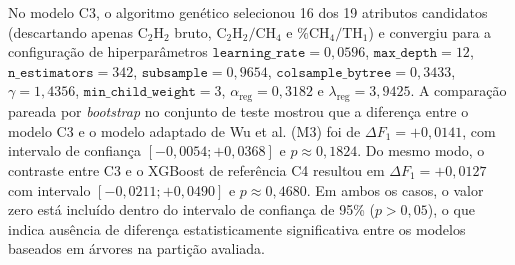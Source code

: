 \begin{table}[H]
\centering
\caption{Desempenho diagnóstico multiclasse no Track B sobre o conjunto de teste e validação cruzada.}
\label{tab:track_b_desempenho}
\end{table}

No modelo C3, o algoritmo genético selecionou 16 dos 19 atributos candidatos (descartando apenas $\text{C}_2\text{H}_2$ bruto, $\text{C}_2\text{H}_2/\text{CH}_4$ e $\% \text{CH}_4/\text{TH}_1$) e convergiu para a configuração de hiperparâmetros $\texttt{learning\_rate} = 0,0596$, $\texttt{max\_depth} = 12$, $\texttt{n\_estimators} = 342$, $\texttt{subsample} = 0,9654$, $\texttt{colsample\_bytree} = 0,3433$, $\gamma = 1,4356$, $\texttt{min\_child\_weight} = 3$, $\alpha_{\text{reg}} = 0,3182$ e $\lambda_{\text{reg}} = 3,9425$. A comparação pareada por \textit{bootstrap} no conjunto de teste mostrou que a diferença entre o modelo C3 e o modelo adaptado de Wu et al. (M3) foi de $\Delta F_1 = +0,0141$, com intervalo de confiança $[-0,0054; +0,0368]$ e $p \approx 0,1824$. Do mesmo modo, o contraste entre C3 e o XGBoost de referência C4 resultou em $\Delta F_1 = +0,0127$ com intervalo $[-0,0211; +0,0490]$ e $p \approx 0,4680$. Em ambos os casos, o valor zero está incluído dentro do intervalo de confiança de 95\% ($p > 0,05$), o que indica ausência de diferença estatisticamente significativa entre os modelos baseados em árvores na partição avaliada. 

